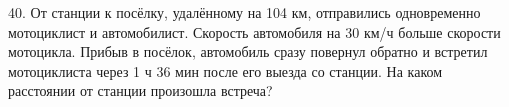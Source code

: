 40. От станции к посёлку, удалённому на 104 км, отправились одновременно мотоциклист и автомобилист. Скорость автомобиля на 30 км/ч больше скорости мотоцикла. Прибыв в посёлок, автомобиль сразу повернул обратно и встретил мотоциклиста через 1 ч 36 мин после его выезда со станции. На каком расстоянии от станции произошла встреча?\\
